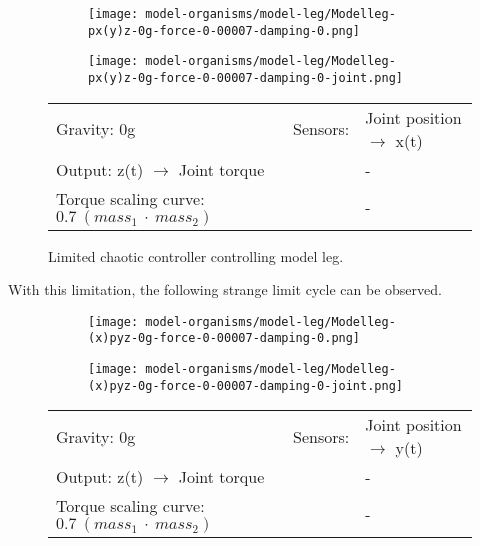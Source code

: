 \documentclass[main]{subfiles}
\begin{document}
\begin{figure}[H]
	\centering
		\begin{subfigure}[c]{0.45\textwidth}
	\texttt{[image: model-organisms/model-leg/Modelleg-px(y)z-0g-force-0-00007-damping-0.png]}
		\end{subfigure}
	\begin{subfigure}[c]{0.45\textwidth}
	\texttt{[image: model-organisms/model-leg/Modelleg-px(y)z-0g-force-0-00007-damping-0-joint.png]}
		\end{subfigure}
	\caption[Limited chaotic controller controlling model leg]{Limited chaotic controller controlling model leg.}
	\begin{tabular}{l|ll}
	\hline 
	Gravity: 0g  & Sensors: & Joint position \(\rightarrow\) x(t)\\
	 Output: z(t) \(\rightarrow\) Joint torque & & - \\
	  Torque scaling curve: \(0.7~(mass_1~\cdot~mass_2)\) & & - \\
	  \hline
	\end{tabular}
	\label{figure:limited-model-leg1}
\end{figure}

With this limitation, the following strange limit cycle can be observed.

\begin{figure}[H]
	\centering
		\begin{subfigure}[c]{0.45\textwidth}
	\texttt{[image: model-organisms/model-leg/Modelleg-(x)pyz-0g-force-0-00007-damping-0.png]}
		\end{subfigure}
	\begin{subfigure}[c]{0.45\textwidth}
	\texttt{[image: model-organisms/model-leg/Modelleg-(x)pyz-0g-force-0-00007-damping-0-joint.png]}
		\end{subfigure}
	\caption[Limited chaotic controller controlling model leg]{}
	\begin{tabular}{l|ll}
	\hline 
	Gravity: 0g  & Sensors: & Joint position \(\rightarrow\) y(t)\\
	 Output: z(t) \(\rightarrow\) Joint torque & & - \\
	  Torque scaling curve: \(0.7~(mass_1~\cdot~mass_2)\) & & - \\
	  \hline
	\end{tabular}

	\label{figure:limited-model-leg2}
\end{figure}
\end{document}
